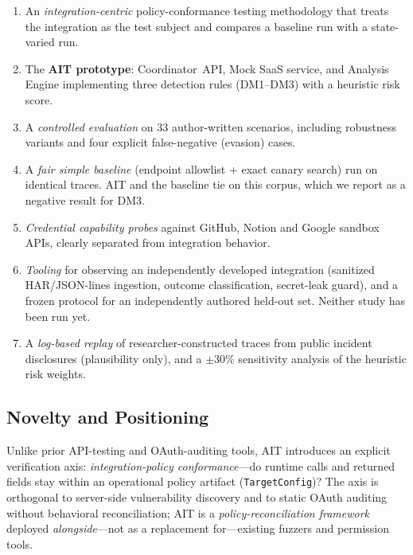 \documentclass[conference]{IEEEtran}
\begin{document}
\begin{enumerate}
  \item An \emph{integration-centric} policy-conformance testing
        methodology that treats the integration as the test subject and
        compares a baseline run with a state-varied run.
  \item The \textbf{AIT prototype}: Coordinator~API, Mock SaaS service,
        and Analysis Engine implementing three detection rules (DM1--DM3)
        with a heuristic risk score.
  \item A \emph{controlled evaluation} on 33 author-written scenarios,
        including robustness variants and four explicit false-negative
        (evasion) cases.
  \item A \emph{fair simple baseline} (endpoint allowlist + exact canary
        search) run on identical traces. AIT and the baseline tie on this
        corpus, which we report as a negative result for DM3.
  \item \emph{Credential capability probes} against GitHub, Notion and
        Google sandbox APIs, clearly separated from integration behavior.
  \item \emph{Tooling} for observing an independently developed
        integration (sanitized HAR/JSON-lines ingestion, outcome
        classification, secret-leak guard), and a frozen protocol for
        an independently authored held-out set. Neither study has been
        run yet.
  \item A \emph{log-based replay} of researcher-constructed traces from
        public incident disclosures (plausibility only), and a
        $\pm30\%$ sensitivity analysis of the heuristic risk weights.
\end{enumerate}

\subsection{Novelty and Positioning}

Unlike prior API-testing and OAuth-auditing tools, AIT introduces an
explicit verification axis: \emph{integration-policy conformance}---do
runtime calls and returned fields stay within an operational policy
artifact (\texttt{TargetConfig})? The axis is orthogonal to server-side
vulnerability discovery and to static OAuth auditing without behavioral
reconciliation; AIT is a \emph{policy-reconciliation framework} deployed
\emph{alongside}---not as a replacement for---existing fuzzers and
permission tools.
\end{document}
